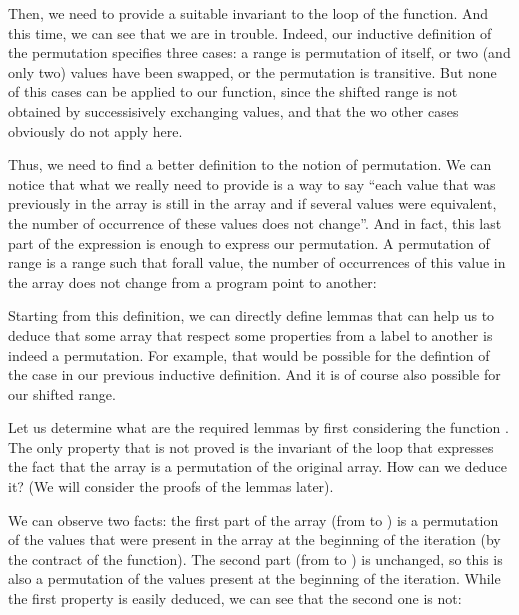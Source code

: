 Then, we need to provide a suitable invariant to the loop of the
 function. And this time, we can see that we are in trouble.
Indeed, our inductive definition of the permutation specifies three cases: a
range is permutation of itself, or two (and only two) values have been swapped,
or the permutation is transitive. But none of this cases can be applied to our 
 function, since the shifted range is not obtained by
successisively exchanging values, and that the wo other cases obviously do not
apply here.



Thus, we need to find a better definition to the notion of permutation. We can
notice that what we really need to provide is a way to say ``each value that
was previously in the array is still in the array and if several values were
equivalent, the number of occurrence of these values does not change''. And in
fact, this last part of the expression is enough to express our permutation.
A permutation of range is a range such that forall value, the number of
occurrences of this value in the array does not change from a program point to
another:






Starting from this definition, we can directly define lemmas that can help us
to deduce that some array that respect some properties from a label to another
is indeed a permutation. For example, that would be possible for the defintion
of the case  in our previous inductive definition. And it is
of course also possible for our shifted range.




Let us determine what are the required lemmas by first considering the function
. The only property that is not proved is the invariant
of the loop that expresses the fact that the array is a permutation of the
original array. How can we deduce it? (We will consider the proofs of the lemmas
later).




We can observe two facts: the first part of the array (from  to
) is a permutation of the values that were present in the array
at the beginning of the iteration (by the contract of the 
function). The second part (from  to ) is
unchanged, so this is also a permutation of the values present at the beginning
of the iteration. While the first property is easily deduced, we can see that
the second one is not:



